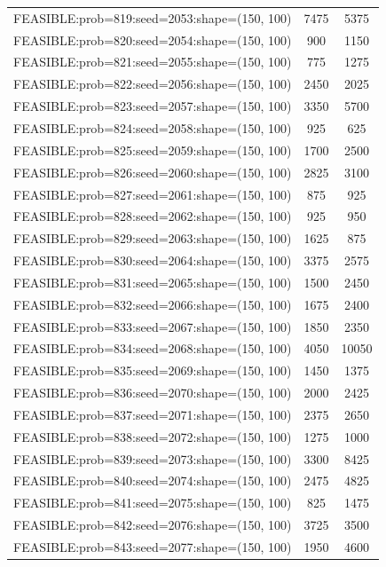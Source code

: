 \begin{longtable}{lcc}
FEASIBLE:prob=819:seed=2053:shape=(150, 100) &     7475 &  5375 \\
FEASIBLE:prob=820:seed=2054:shape=(150, 100) &      900 &  1150 \\
FEASIBLE:prob=821:seed=2055:shape=(150, 100) &      775 &  1275 \\
FEASIBLE:prob=822:seed=2056:shape=(150, 100) &     2450 &  2025 \\
FEASIBLE:prob=823:seed=2057:shape=(150, 100) &     3350 &  5700 \\
FEASIBLE:prob=824:seed=2058:shape=(150, 100) &      925 &   625 \\
FEASIBLE:prob=825:seed=2059:shape=(150, 100) &     1700 &  2500 \\
FEASIBLE:prob=826:seed=2060:shape=(150, 100) &     2825 &  3100 \\
FEASIBLE:prob=827:seed=2061:shape=(150, 100) &      875 &   925 \\
FEASIBLE:prob=828:seed=2062:shape=(150, 100) &      925 &   950 \\
FEASIBLE:prob=829:seed=2063:shape=(150, 100) &     1625 &   875 \\
FEASIBLE:prob=830:seed=2064:shape=(150, 100) &     3375 &  2575 \\
FEASIBLE:prob=831:seed=2065:shape=(150, 100) &     1500 &  2450 \\
FEASIBLE:prob=832:seed=2066:shape=(150, 100) &     1675 &  2400 \\
FEASIBLE:prob=833:seed=2067:shape=(150, 100) &     1850 &  2350 \\
FEASIBLE:prob=834:seed=2068:shape=(150, 100) &     4050 & 10050 \\
FEASIBLE:prob=835:seed=2069:shape=(150, 100) &     1450 &  1375 \\
FEASIBLE:prob=836:seed=2070:shape=(150, 100) &     2000 &  2425 \\
FEASIBLE:prob=837:seed=2071:shape=(150, 100) &     2375 &  2650 \\
FEASIBLE:prob=838:seed=2072:shape=(150, 100) &     1275 &  1000 \\
FEASIBLE:prob=839:seed=2073:shape=(150, 100) &     3300 &  8425 \\
FEASIBLE:prob=840:seed=2074:shape=(150, 100) &     2475 &  4825 \\
FEASIBLE:prob=841:seed=2075:shape=(150, 100) &      825 &  1475 \\
FEASIBLE:prob=842:seed=2076:shape=(150, 100) &     3725 &  3500 \\
FEASIBLE:prob=843:seed=2077:shape=(150, 100) &     1950 &  4600 \\

\end{longtable}
